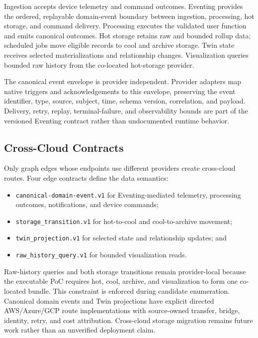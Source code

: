 Ingestion accepts device telemetry and command outcomes. Eventing provides the
ordered, replayable domain-event boundary between ingestion, processing, hot
storage, and command delivery. Processing executes the validated user function
and emits canonical outcomes. Hot storage retains raw and bounded rollup data;
scheduled jobs move eligible records to cool and archive storage. Twin state
receives selected materializations and relationship changes. Visualization
queries bounded raw history from the co-located hot-storage provider.

The canonical event envelope is provider independent. Provider adapters map
native triggers and acknowledgements to this envelope, preserving the event
identifier, type, source, subject, time, schema version, correlation, and
payload. Delivery, retry, replay, terminal-failure, and observability bounds
are part of the versioned Eventing contract rather than undocumented runtime
behavior.

\subsection{Cross-Cloud Contracts}
\label{sec:cross-cloud-gluecode}

Only graph edges whose endpoints use different providers create cross-cloud
routes. Four edge contracts define the data semantics:

\begin{itemize}
    \item \texttt{canonical-domain-event.v1} for Eventing-mediated telemetry,
    processing outcomes, notifications, and device commands;
    \item \texttt{storage\_transition.v1} for hot-to-cool and cool-to-archive
    movement;
    \item \texttt{twin\_projection.v1} for selected state and relationship
    updates; and
    \item \texttt{raw\_history\_query.v1} for bounded visualization reads.
\end{itemize}

Raw-history queries and both storage transitions remain provider-local because
the executable PoC requires hot, cool, archive, and visualization to form one
co-located bundle. This constraint is enforced during candidate enumeration.
Canonical domain events and Twin projections have explicit directed
AWS/Azure/GCP route implementations with source-owned transfer, bridge,
identity, retry, and cost attribution. Cross-cloud storage migration remains
future work rather than an unverified deployment claim.

